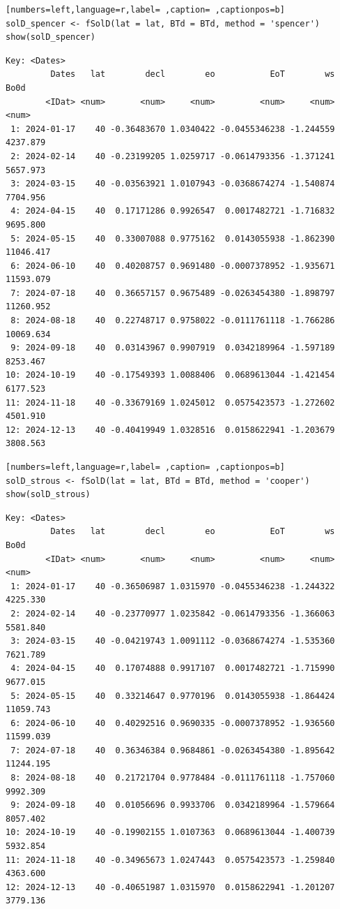 \begin{lstlisting}[numbers=left,language=r,label= ,caption= ,captionpos=b]
solD_spencer <- fSolD(lat = lat, BTd = BTd, method = 'spencer')
show(solD_spencer)
\end{lstlisting}

\begin{verbatim}
Key: <Dates>
         Dates   lat        decl        eo           EoT        ws      Bo0d
        <IDat> <num>       <num>     <num>         <num>     <num>     <num>
 1: 2024-01-17    40 -0.36483670 1.0340422 -0.0455346238 -1.244559  4237.879
 2: 2024-02-14    40 -0.23199205 1.0259717 -0.0614793356 -1.371241  5657.973
 3: 2024-03-15    40 -0.03563921 1.0107943 -0.0368674274 -1.540874  7704.956
 4: 2024-04-15    40  0.17171286 0.9926547  0.0017482721 -1.716832  9695.800
 5: 2024-05-15    40  0.33007088 0.9775162  0.0143055938 -1.862390 11046.417
 6: 2024-06-10    40  0.40208757 0.9691480 -0.0007378952 -1.935671 11593.079
 7: 2024-07-18    40  0.36657157 0.9675489 -0.0263454380 -1.898797 11260.952
 8: 2024-08-18    40  0.22748717 0.9758022 -0.0111761118 -1.766286 10069.634
 9: 2024-09-18    40  0.03143967 0.9907919  0.0342189964 -1.597189  8253.467
10: 2024-10-19    40 -0.17549393 1.0088406  0.0689613044 -1.421454  6177.523
11: 2024-11-18    40 -0.33679169 1.0245012  0.0575423573 -1.272602  4501.910
12: 2024-12-13    40 -0.40419949 1.0328516  0.0158622941 -1.203679  3808.563
\end{verbatim}

\begin{lstlisting}[numbers=left,language=r,label= ,caption= ,captionpos=b]
solD_strous <- fSolD(lat = lat, BTd = BTd, method = 'cooper')
show(solD_strous)
\end{lstlisting}

\begin{verbatim}
Key: <Dates>
         Dates   lat        decl        eo           EoT        ws      Bo0d
        <IDat> <num>       <num>     <num>         <num>     <num>     <num>
 1: 2024-01-17    40 -0.36506987 1.0315970 -0.0455346238 -1.244322  4225.330
 2: 2024-02-14    40 -0.23770977 1.0235842 -0.0614793356 -1.366063  5581.840
 3: 2024-03-15    40 -0.04219743 1.0091112 -0.0368674274 -1.535360  7621.789
 4: 2024-04-15    40  0.17074888 0.9917107  0.0017482721 -1.715990  9677.015
 5: 2024-05-15    40  0.33214647 0.9770196  0.0143055938 -1.864424 11059.743
 6: 2024-06-10    40  0.40292516 0.9690335 -0.0007378952 -1.936560 11599.039
 7: 2024-07-18    40  0.36346384 0.9684861 -0.0263454380 -1.895642 11244.195
 8: 2024-08-18    40  0.21721704 0.9778484 -0.0111761118 -1.757060  9992.309
 9: 2024-09-18    40  0.01056696 0.9933706  0.0342189964 -1.579664  8057.402
10: 2024-10-19    40 -0.19902155 1.0107363  0.0689613044 -1.400739  5932.854
11: 2024-11-18    40 -0.34965673 1.0247443  0.0575423573 -1.259840  4363.600
12: 2024-12-13    40 -0.40651987 1.0315970  0.0158622941 -1.201207  3779.136
\end{verbatim}

